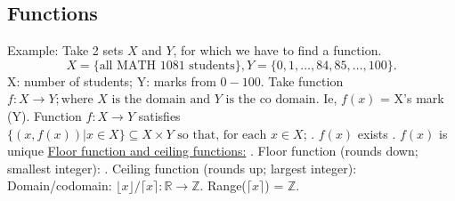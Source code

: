 \documentclass{article}
\begin{document}
\subsection{Functions}
Example: Take 2 sets $X$ and $Y$, for which we have to find a function.
$$X = \{\text{all MATH 1081 students} \}, Y = \{ 0, 1, \dots , 84, 85, \dots, 100\}.$$
X: number of students; Y: marks from $0 - 100$.
\newline
Take function $f: X \to Y; \text{where } X \text{ is the domain and } Y \text{ is the co domain}.$
\newline
Ie, $f(x)$ = X's mark (Y).
\newline
Function $f: X \to Y$ satisfies $\{ (x, f(x)) | x \in X\} \subseteq X \times Y \text{ so that, for each } x \in X$;
. $f(x)$ exists
. $f(x)$ is unique
\newline
{}
\newline
\newline
{}
\newline
\newline
\underline{ Floor function and ceiling functions:}
\newline
{}. Floor function (rounds down; smallest integer):
\newline
\newline
{}
\newline
{}. Ceiling function (rounds up; largest integer):
\newline
\newline
{}
\newline
{}
Domain/codomain: $\lfloor x \rfloor / \lceil x \rceil: \mathbb{R} \to \mathbb{Z}.$
\newline
\newline
Range($\lceil x \rceil$) = $\mathbb{Z}.$
\newline
{}
\newpage
\end{document}
